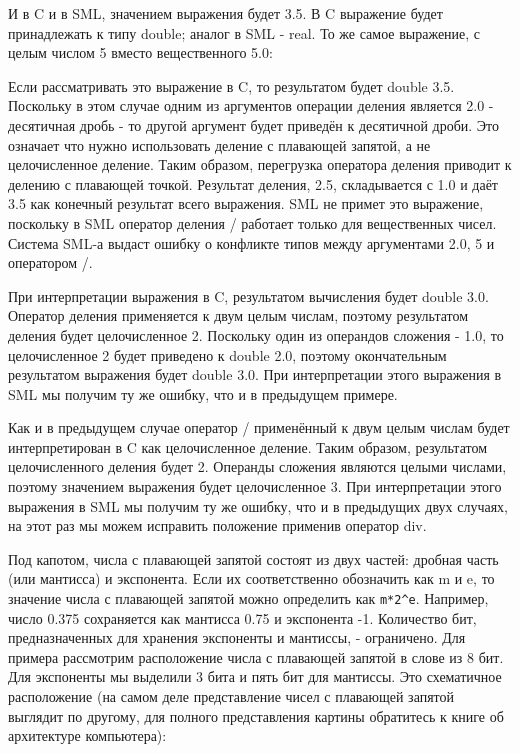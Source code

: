 И в C и в SML, значением выражения будет 3.5. В C выражение будет принадлежать к типу double; аналог в SML - real. То же самое выражение, с целым числом 5 вместо вещественного 5.0:

Если рассматривать это выражение в C, то результатом будет double 3.5. Поскольку в этом случае одним из аргументов операции деления является 2.0 - десятичная дробь - то другой аргумент будет приведён к десятичной дроби. Это означает что нужно использовать деление с плавающей запятой, а не целочисленное деление. Таким образом, перегрузка оператора деления приводит к делению с плавающей точкой. Результат деления, 2.5, складывается с 1.0 и даёт 3.5 как конечный результат всего выражения. SML не примет это выражение, поскольку в SML оператор деления / работает только для вещественных чисел. Система SML-а выдаст ошибку о конфликте типов между аргументами 2.0, 5 и оператором /.

При интерпретации выражения в C, результатом вычисления будет double 3.0. Оператор деления применяется к двум целым числам, поэтому результатом деления будет целочисленное 2. Поскольку один из операндов сложения - 1.0, то целочисленное 2 будет приведено к double 2.0, поэтому окончательным результатом выражения будет double 3.0. При интерпретации этого выражения в SML мы получим ту же ошибку, что и в предыдущем  примере.

Как и в предыдущем случае оператор / применённый к двум целым числам будет интерпретирован в C как целочисленное деление. Таким образом, результатом целочисленного деления будет 2. Операнды сложения являются целыми числами, поэтому значением выражения будет целочисленное 3. При интерпретации этого выражения в SML мы получим ту же ошибку, что и в предыдущих двух случаях, на этот раз мы можем исправить положение применив оператор div.

Под капотом, числа с плавающей запятой состоят из двух частей: дробная часть (или мантисса) и экспонента. Если их соответственно обозначить как m и e, то значение числа с плавающей запятой можно определить как \lstinline|m*2^e|. Например, число 0.375 сохраняется как мантисса 0.75 и экспонента -1. Количество бит, предназначенных для хранения экспоненты и мантиссы, - ограничено. Для примера рассмотрим расположение числа с плавающей запятой в слове из 8 бит. Для экспоненты мы выделили 3 бита и пять бит для мантиссы. Это схематичное расположение (на самом деле представление чисел с плавающей запятой выглядит по другому, для полного представления картины обратитесь к книге об архитектуре компьютера):

